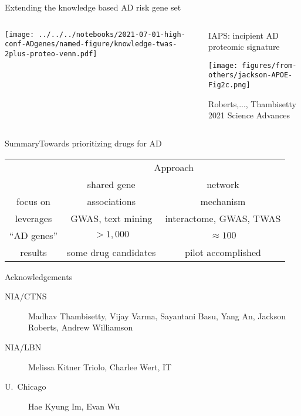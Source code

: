 \documentclass[aspectratio=169]{beamer}
\begin{document}
\begin{frame}{Extending the knowledge based AD risk gene set}
\begin{columns}[t]
\begin{column}{0.5\textwidth}

\texttt{[image: ../../../notebooks/2021-07-01-high-conf-ADgenes/named-figure/knowledge-twas-2plus-proteo-venn.pdf]}
\end{column}

\begin{column}{0.5\textwidth}
\begin{center}
IAPS: incipient AD proteomic signature
\end{center}

\begin{center}
\texttt{[image: figures/from-others/jackson-APOE-Fig2c.png]}
\end{center}

\begin{center}
\tiny Roberts,..., Thambisetty 2021 Science Advances
\end{center}
\end{column}
\end{columns}
\end{frame}



\begin{frame}{Summary}{Towards prioritizing drugs for AD}
\begin{tabular}{|c|c|c|}
\hline
& \multicolumn{2}{c|}{Approach} \\
& shared gene & network \\
\hline
focus on & associations & mechanism \\
leverages & GWAS, text mining & interactome, GWAS, TWAS \\
``AD genes'' & $>1,000$ & $\approx 100$ \\
results & some drug candidates & pilot accomplished \\
\hline
\end{tabular}
\end{frame}

\begin{frame}{Acknowledgements}
\begin{description}
\item[NIA/CTNS] Madhav Thambisetty, Vijay Varma, Sayantani
	Basu, Yang An, Jackson Roberts, Andrew Williamson
\item[NIA/LBN] Melissa Kitner Triolo, Charlee Wert, IT
\item[U.~Chicago] Hae Kyung Im, Evan Wu
\end{description}
\end{frame}
\end{document}
